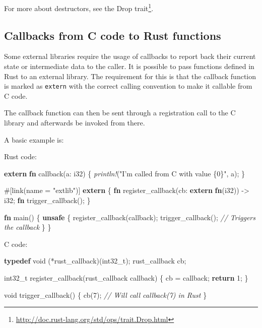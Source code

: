 \documentclass[a4paper,]{book}
\newenvironment{Shaded}{\begin{snugshade}}{\end{snugshade}}
\newcommand{\KeywordTok}[1]{\textcolor[rgb]{0.13,0.29,0.53}{\textbf{{#1}}}}
\newcommand{\DataTypeTok}[1]{\textcolor[rgb]{0.13,0.29,0.53}{{#1}}}
\newcommand{\DecValTok}[1]{\textcolor[rgb]{0.00,0.00,0.81}{{#1}}}
\newcommand{\StringTok}[1]{\textcolor[rgb]{0.31,0.60,0.02}{{#1}}}
\newcommand{\CommentTok}[1]{\textcolor[rgb]{0.56,0.35,0.01}{\textit{{#1}}}}
\newcommand{\PreprocessorTok}[1]{\textcolor[rgb]{0.56,0.35,0.01}{\textit{{#1}}}}
\newcommand{\AttributeTok}[1]{\textcolor[rgb]{0.77,0.63,0.00}{{#1}}}
\newcommand{\NormalTok}[1]{{#1}}
\renewcommand{\href}[2]{#2\footnote{\url{#1}}}
\begin{document}
For more about destructors, see the
\href{http://doc.rust-lang.org/std/ops/trait.Drop.html}{Drop trait}.

\subsection{Callbacks from C code to Rust
functions}\label{callbacks-from-c-code-to-rust-functions}

Some external libraries require the usage of callbacks to report back
their current state or intermediate data to the caller. It is possible
to pass functions defined in Rust to an external library. The
requirement for this is that the callback function is marked as
\texttt{extern} with the correct calling convention to make it callable
from C code.

The callback function can then be sent through a registration call to
the C library and afterwards be invoked from there.

A basic example is:

Rust code:

\begin{Shaded}
\begin{Highlighting}[]
\KeywordTok{extern} \KeywordTok{fn} \NormalTok{callback(a: }\DataTypeTok{i32}\NormalTok{) \{}
    \PreprocessorTok{println!}\NormalTok{(}\StringTok{"I'm called from C with value \{0\}"}\NormalTok{, a);}
\NormalTok{\}}

\AttributeTok{#[}\NormalTok{link}\AttributeTok{(}\NormalTok{name }\AttributeTok{=} \StringTok{"extlib"}\AttributeTok{)]}
\KeywordTok{extern} \NormalTok{\{}
   \KeywordTok{fn} \NormalTok{register_callback(cb: }\KeywordTok{extern} \KeywordTok{fn}\NormalTok{(}\DataTypeTok{i32}\NormalTok{)) -> }\DataTypeTok{i32}\NormalTok{;}
   \KeywordTok{fn} \NormalTok{trigger_callback();}
\NormalTok{\}}

\KeywordTok{fn} \NormalTok{main() \{}
    \KeywordTok{unsafe} \NormalTok{\{}
        \NormalTok{register_callback(callback);}
        \NormalTok{trigger_callback(); }\CommentTok{// Triggers the callback}
    \NormalTok{\}}
\NormalTok{\}}
\end{Highlighting}
\end{Shaded}

C code:

\begin{Shaded}
\begin{Highlighting}[]
\KeywordTok{typedef} \DataTypeTok{void} \NormalTok{(*rust_callback)(}\DataTypeTok{int32_t}\NormalTok{);}
\NormalTok{rust_callback cb;}

\DataTypeTok{int32_t} \NormalTok{register_callback(rust_callback callback) \{}
    \NormalTok{cb = callback;}
    \KeywordTok{return} \DecValTok{1}\NormalTok{;}
\NormalTok{\}}

\DataTypeTok{void} \NormalTok{trigger_callback() \{}
  \NormalTok{cb(}\DecValTok{7}\NormalTok{); }\CommentTok{// Will call callback(7) in Rust}
\NormalTok{\}}
\end{Highlighting}
\end{Shaded}
\end{document}
